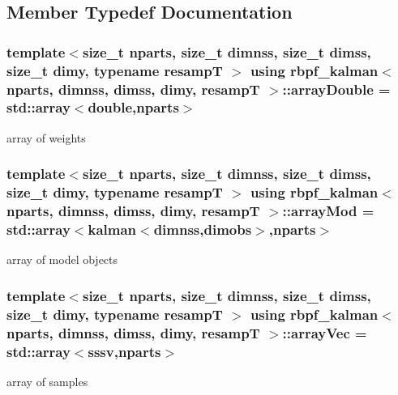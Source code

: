 \subsection{Member Typedef Documentation}
\subsubsection[{\texorpdfstring{array\+Double}{arrayDouble}}]{\setlength{\rightskip}{0pt plus 5cm}template$<$size\+\_\+t nparts, size\+\_\+t dimnss, size\+\_\+t dimss, size\+\_\+t dimy, typename resampT $>$ using {\bf rbpf\+\_\+kalman}$<$ nparts, dimnss, dimss, dimy, resampT $>$\+::{\bf array\+Double} =  std\+::array$<$double,nparts$>$}\hypertarget{classrbpf__kalman_a1911a9cc687ba6fe9890e5f448d1626a}{}\label{classrbpf__kalman_a1911a9cc687ba6fe9890e5f448d1626a}
array of weights 
\subsubsection[{\texorpdfstring{array\+Mod}{arrayMod}}]{\setlength{\rightskip}{0pt plus 5cm}template$<$size\+\_\+t nparts, size\+\_\+t dimnss, size\+\_\+t dimss, size\+\_\+t dimy, typename resampT $>$ using {\bf rbpf\+\_\+kalman}$<$ nparts, dimnss, dimss, dimy, resampT $>$\+::{\bf array\+Mod} =  std\+::array$<${\bf kalman}$<$dimnss,dimobs$>$,nparts$>$}\hypertarget{classrbpf__kalman_aaf46b726f40b4aaa3be3f225790f76f6}{}\label{classrbpf__kalman_aaf46b726f40b4aaa3be3f225790f76f6}
array of model objects 
\subsubsection[{\texorpdfstring{array\+Vec}{arrayVec}}]{\setlength{\rightskip}{0pt plus 5cm}template$<$size\+\_\+t nparts, size\+\_\+t dimnss, size\+\_\+t dimss, size\+\_\+t dimy, typename resampT $>$ using {\bf rbpf\+\_\+kalman}$<$ nparts, dimnss, dimss, dimy, resampT $>$\+::{\bf array\+Vec} =  std\+::array$<${\bf sssv},nparts$>$}\hypertarget{classrbpf__kalman_a214378a5c76ff8bfc91cf77bfa523d02}{}\label{classrbpf__kalman_a214378a5c76ff8bfc91cf77bfa523d02}
array of samples 
